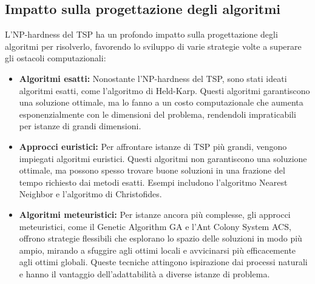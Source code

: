 \subsection{Impatto sulla progettazione degli algoritmi}

L'\Gls{NP}-hardness del \Gls{TSP} ha un profondo impatto sulla progettazione degli algoritmi per risolverlo, favorendo lo sviluppo di varie strategie volte a superare gli ostacoli computazionali:

\begin{itemize}
	\item \textbf{Algoritmi esatti:} Nonostante l'\Gls{NP}-hardness del \Gls{TSP}, sono stati ideati algoritmi esatti, come l'algoritmo di Held-Karp. Questi algoritmi garantiscono una soluzione ottimale, ma lo fanno a un costo computazionale che aumenta esponenzialmente con le dimensioni del problema, rendendoli impraticabili per istanze di grandi dimensioni.
	\item \textbf{Approcci euristici:} Per affrontare istanze di \Gls{TSP} più grandi, vengono impiegati algoritmi euristici. Questi algoritmi non garantiscono una soluzione ottimale, ma possono spesso trovare buone soluzioni in una frazione del tempo richiesto dai metodi esatti. Esempi includono l'algoritmo Nearest Neighbor e l'algoritmo di Christofides.
  \item \textbf{Algoritmi meteuristici:} Per istanze ancora più complesse, gli approcci meteuristici, come il Genetic Algorithm \Gls{GA} e l'Ant Colony System \Gls{ACS}, offrono strategie flessibili che esplorano lo spazio delle soluzioni in modo più ampio, mirando a sfuggire agli ottimi locali e avvicinarsi più efficacemente agli ottimi globali. Queste tecniche attingono ispirazione dai processi naturali e hanno il vantaggio dell'adattabilità a diverse istanze di problema.
\end{itemize}
